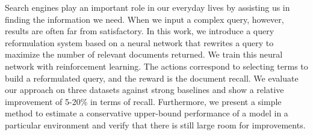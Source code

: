 Search engines play an important role in our everyday lives by assisting us in finding the information we need. When we input a complex query, however, results are often far from satisfactory. In this work, we introduce a query reformulation system based on a neural network that rewrites a query to maximize the number of relevant documents returned. We train this neural network with reinforcement learning. The actions correspond to selecting terms to build a reformulated query, and the reward is the document recall. We evaluate our approach on three datasets against strong baselines and show a relative improvement of 5-20\% in terms of recall. Furthermore, we present a simple method to estimate a conservative upper-bound performance of a model in a particular environment and verify that there is still large room for improvements.

